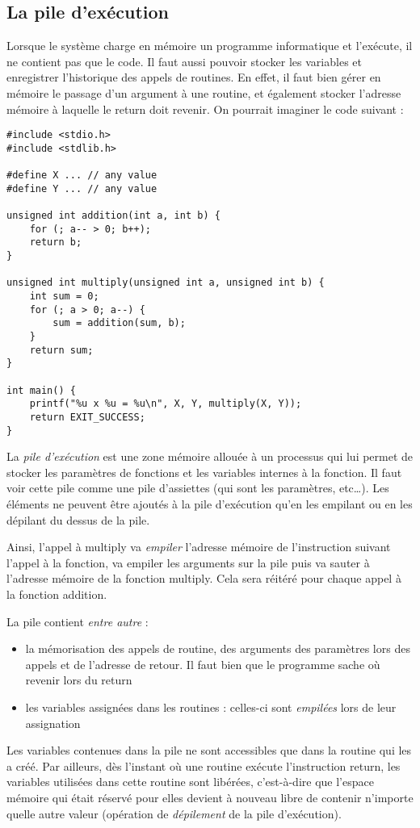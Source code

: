 \documentclass[../../../main.tex]{subfiles}
\begin{document}
\subsection{La pile d'exécution}
Lorsque le système charge en mémoire un programme informatique et l'exécute, il ne contient pas que le code. Il faut aussi pouvoir stocker les variables et enregistrer l'historique des appels de routines. En effet, il faut bien	gérer en mémoire le passage d'un argument à une routine, et également stocker l'adresse mémoire à laquelle le \textsf{return} doit revenir. On pourrait imaginer le code suivant :
\begin{verbatim}
#include <stdio.h>
#include <stdlib.h>

#define X ... // any value
#define Y ... // any value

unsigned int addition(int a, int b) {
	for (; a-- > 0; b++);
	return b;
}

unsigned int multiply(unsigned int a, unsigned int b) {
	int sum = 0;
	for (; a > 0; a--) {
		sum = addition(sum, b);
	}
	return sum;
}

int main() {
	printf("%u x %u = %u\n", X, Y, multiply(X, Y));
	return EXIT_SUCCESS;
}
\end{verbatim}
La \textit{pile d'exécution} est une zone mémoire allouée à un processus qui lui permet de stocker les paramètres de fonctions et les variables internes à la fonction. Il faut voir cette pile comme une pile d'assiettes (qui sont les paramètres, etc\dots). Les éléments ne peuvent être ajoutés à la pile d'exécution qu'en les empilant ou en les dépilant du dessus de la pile.
 
Ainsi, l'appel à \textsf{multiply} va \textit{empiler} l'adresse mémoire de l'instruction suivant l'appel à la fonction, va empiler les arguments sur la pile puis va sauter à l'adresse mémoire de la fonction \textsf{multiply}. Cela sera réitéré pour chaque appel à la fonction \textsf{addition}.
 
La pile contient \textit{entre autre} :
\begin{itemize}
	\item la mémorisation des appels de routine, des arguments des paramètres lors des appels et de l'adresse de retour. Il faut bien que le programme sache où revenir lors du \textsf{return}
	\item les variables assignées dans les routines : celles-ci sont \textit{empilées} lors de leur assignation
\end{itemize}
Les variables contenues dans la pile ne sont accessibles que dans la routine qui les a créé. Par ailleurs, dès l'instant où une routine exécute l'instruction \textsf{return}, les variables utilisées dans cette routine sont libérées, c'est-à-dire que l'espace mémoire qui était réservé pour elles devient à nouveau libre de contenir n'importe quelle autre valeur (opération de \textit{dépilement} de la pile d'exécution).
 
\end{document}
